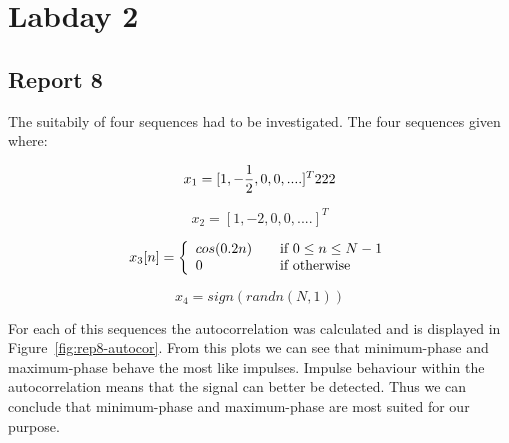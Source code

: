 \documentclass[11pt,titlepage]{report}
\begin{document}
\section{Labday 2}
\subsection{Report 8}
The suitabily of four sequences had to be investigated. The four sequences given where:

\begin{equation}
x_1 = [1,-\frac{1}{2},0,0,....]^T \\ 
222
\end{equation}

\begin{equation}
x_2 = [1,-2,0,0,....]^T
\end{equation}
	
\begin{equation}
x_3[n] = \left\{ 
  \begin{array}{l l}
   cos(0.2n) & \quad \textrm{if $0 \leq n \leq N-1 $}\\
    0 & \quad \textrm{if otherwise}
  \end{array} \right.
\end{equation}
 
\begin{equation}
x_4 = sign(randn(N,1))
\end{equation}

For each of this sequences the autocorrelation was calculated and is displayed in Figure~\ref{fig:rep8-autocor}. From this plots we can see that minimum-phase and maximum-phase behave the most like impulses. Impulse behaviour within the autocorrelation means that the signal can better be detected. Thus we can conclude that minimum-phase and maximum-phase are most suited for our purpose. 
\end{document}
